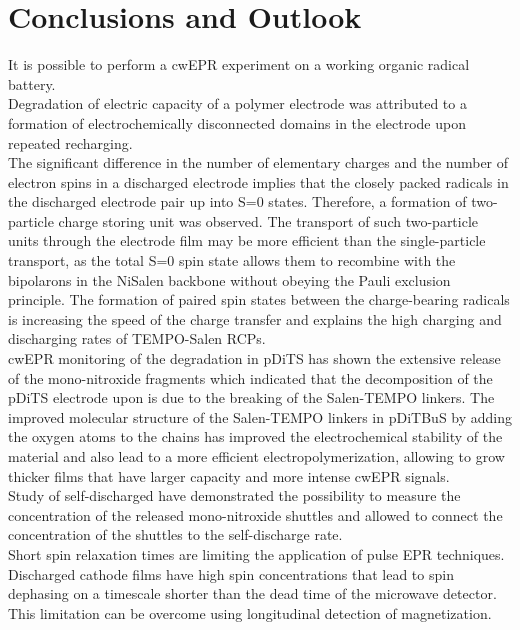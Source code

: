 \chapter{Conclusions and Outlook}

It is possible to perform a cwEPR experiment on a working organic radical battery.\\
Degradation of electric capacity of a polymer electrode was attributed to a formation of electrochemically disconnected domains in the electrode upon repeated recharging.\\

The significant difference in the number of elementary charges and the number of electron spins in a discharged electrode implies that the closely packed radicals in the discharged electrode pair up into S=0 states. Therefore, a formation of two-particle charge storing unit was observed. The transport of such two-particle units through the electrode film may be more efficient than the single-particle transport, as the total S=0 spin state allows them to recombine with the bipolarons in the NiSalen backbone without obeying the Pauli exclusion principle. The formation of paired spin states between the charge-bearing radicals is increasing the speed of the charge transfer and explains the high charging and discharging rates of TEMPO-Salen RCPs.\\

cwEPR monitoring of the degradation in pDiTS has shown the extensive release of the mono-nitroxide fragments which indicated that the decomposition of the pDiTS electrode upon is due to the breaking of the Salen-TEMPO linkers. The improved molecular structure of the Salen-TEMPO linkers in pDiTBuS by adding the oxygen atoms to the chains has improved the electrochemical stability of the material and also lead to a more efficient electropolymerization, allowing to grow thicker films that have larger capacity and more intense cwEPR signals.\\

Study of self-discharged have demonstrated the possibility to measure the concentration of the released mono-nitroxide shuttles and allowed to connect the concentration of the shuttles to the self-discharge rate.\\

Short spin relaxation times are limiting the application of pulse EPR techniques. Discharged cathode films have high spin concentrations that lead to spin dephasing on a timescale shorter than the dead time of the microwave detector. This limitation can be overcome using longitudinal detection of magnetization.\\

